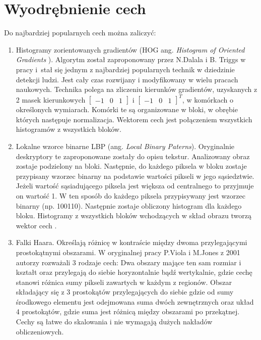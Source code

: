 
\section{Wyodrębnienie cech}

Do najbardziej popularnych cech można zaliczyć:

\begin{enumerate}
\item Histogramy zorientowanych gradientów (HOG ang. \textit{Histogram of Oriented Gradients }). %
Algorytm został zaproponowany przez N.Dalala i B. Triggs w pracy \cite{dalal2005histograms} i~stał się jednym z najbardziej popularnych technik w dziedzinie detekcji ludzi. %
Jest cały czas rozwijany i modyfikowany w wielu pracach naukowych.
Technika polega na zliczeniu kierunków gradientów, uzyskanych z 2 masek kierunkowych \(\begin{bmatrix}-1 & 0 & 1\end{bmatrix} \) i \( \begin{bmatrix}-1 & 0 & 1 \end{bmatrix}^T\), w komórkach o określonych wymiarach. 
Komórki te są organizowane w bloki, w obrębie których następuje normalizacja. 
Wektorem cech jest połączeniem wszystkich histogramów z wszystkich bloków.


\item Lokalne wzorce binarne LBP (ang. \textit{Local Binary Paterns}).
Oryginalnie deskryptory te zaproponowane zostały do opisu tekstur. %
Analizowany obraz zostaje podzielony na bloki. 
Następnie, do każdego piksela w bloku zostaje przypisany wzorzec binarny na podstawie wartości pikseli w jego sąsiedztwie. 
Jeżeli wartość sąsiadującego piksela jest większa od centralnego to przyjmuje on wartość 1. W ten sposób do każdego piksela przypisywany jest wzorzec binarny (np. 100110).
Następnie zostaje obliczony histogram dla każdego bloku. 
Histogramy z wszystkich bloków wchodzących w skład obrazu tworzą wektor cech \cite{ojala2002multiresolution}.

\item Falki Haara.
Określają różnicę w kontraście między dwoma przylegającymi prostokątnymi obszarami. W oryginalnej pracy P.Viola i M.Jones z 2001 \cite{viola2001rapid} autorzy rozważali 3 rodzaje cech: Dwa obszary mające ten sam rozmiar i kształt oraz przylegają do siebie horyzontalnie bądź wertykalnie, gdzie cechę stanowi różnica sumy pikseli zawartych w każdym z regionów. Obszar składający się z 3 prostokątów przylegających do siebie gdzie od sumy środkowego elementu jest odejmowana suma dwóch zewnętrznych oraz układ 4 prostokątów, gdzie suma jest różnicą między obszarami po przekątnej.
Cechy są łatwe do skalowania i nie wymagają dużych nakładów obliczeniowych. 


\end{enumerate}
